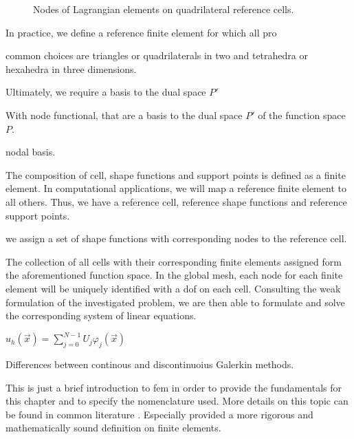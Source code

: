 \begin{figure}
  \centering
  \caption{Nodes of Lagrangian elements on quadrilateral reference cells.}
  \label{eq:lagrange}
\end{figure}


In practice, we define a reference finite element for which all pro


common choices are triangles or quadrilaterals in two and tetrahedra or hexahedra in three dimensions.


Ultimately, we require a basis to the dual space $P'$ 

With node functional, that are a basis to the dual space $P'$ of the function space $P$.

nodal basis.


The composition of cell, shape functions and support points is defined as a finite element. In computational applications, we will map a reference finite element to all others. Thus, we have a reference cell, reference shape functions and reference support points.

 we assign a set of shape functions with corresponding nodes to the reference cell.

The collection of all cells with their corresponding finite elements assigned form the aforementioned function space. In the global mesh, each node for each finite element will be uniquely identified with a \gls{dof} on each cell. Consulting the weak formulation of the investigated problem, we are then able to formulate and solve the corresponding system of linear equations.

$u_h(\vec{x}) = \sum_{j=0}^{N-1} U_j \varphi_j(\vec{x})$

Differences between continous and discontinuoius Galerkin methods.

This is just a brief introduction to \gls{fem} in order to provide the fundamentals for this chapter and to specify the nomenclature used. More details on this topic can be found in common literature \parencite[e.g.][]{girault1986, elman2014, kuzmin2015} . Especially \textcite{brenner2008} provided a more rigorous and mathematically sound definition on finite elements.


